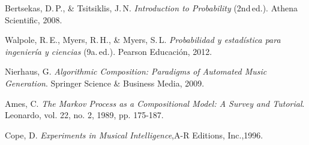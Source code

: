 \documentclass{article}
\theoremstyle{plain}
\theoremstyle{definition}
\begin{document}
\begin{thebibliography}{}
	Bertsekas, D.\,P., \& Tsitsiklis, J.\,N. \textit{Introduction to Probability} (2nd\,ed.). Athena Scientific, 2008.

	Walpole, R.\,E., Myers, R.\,H., \& Myers, S.\,L. \textit{Probabilidad y estadística para ingeniería y ciencias} (9a.\,ed.). Pearson Educación, 2012.

	Nierhaus, G. \textit{Algorithmic Composition: Paradigms of Automated Music Generation}. Springer Science \& Business Media, 2009.

	Ames, C. \textit{The Markov Process as a Compositional Model: A Survey and Tutorial}. Leonardo, vol. 22, no. 2, 1989, pp. 175-187.

	Cope, D. \textit{Experiments in Musical Intelligence},A-R Editions, Inc.,1996.

\end{thebibliography}
\end{document}
